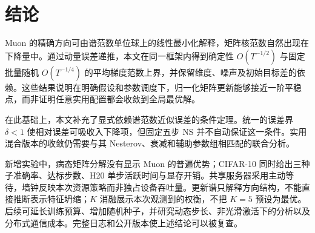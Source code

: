 \section{结论}
Muon 的精确方向可由谱范数单位球上的线性最小化解释，矩阵核范数自然出现在下降量中。通过动量误差递推，本文在同一框架内得到确定性 $O(T^{-1/2})$ 与固定批量随机 $O(T^{-1/4})$ 的平均梯度范数上界，并保留维度、噪声及初始目标差的依赖。这些结果说明在明确假设和参数调度下，归一化矩阵更新能够接近一阶平稳点，而非证明任意实用配置都会收敛到全局最优解。

在此基础上，本文补充了显式依赖谱范数近似误差的条件定理。统一的误差界 $\delta<1$ 使相对误差可吸收入下降项，但固定五步 NS 并不自动保证这一条件。实用混合版本的收敛仍需要与其 Nesterov、衰减和辅助参数组相匹配的联合分析。

新增实验中，病态矩阵分解没有显示 Muon 的普遍优势；CIFAR-10 同时给出三种子准确率、达标步数、H20 单步活跃时间与显存开销。共享服务器采用主动等待，墙钟反映本次资源策略而非独占设备吞吐量。更新谱只解释方向结构，不能直接推断表示特征坍缩；$K$ 消融展示本次观测到的权衡，不把 $K=5$ 预设为最优。后续可延长训练预算、增加随机种子，并研究动态步长、非光滑激活下的分析以及分布式通信成本。完整日志和公开版本使上述结论可以被复查。

